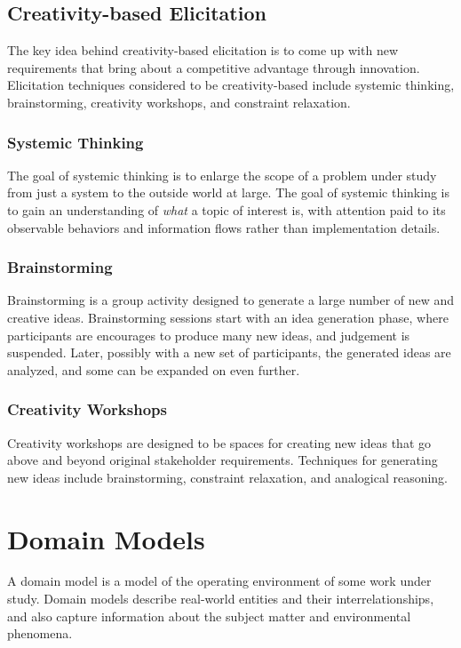 \documentclass[12pt,titlepage]{article}
\begin{document}
    \subsection{Creativity-based Elicitation}
      The key idea behind creativity-based elicitation is to come up with new requirements that bring about a competitive advantage through innovation. Elicitation techniques
      considered to be creativity-based include systemic thinking, brainstorming, creativity workshops, and constraint relaxation.

      \subsubsection{Systemic Thinking}
        The goal of systemic thinking is to enlarge the scope of a problem under study from just a system to the outside world at large. The goal of systemic thinking is to
        gain an understanding of \textit{what} a topic of interest is, with attention paid to its observable behaviors and information flows rather than implementation
        details.

      \subsubsection{Brainstorming}
        Brainstorming is a group activity designed to generate a large number of new and creative ideas. Brainstorming sessions start with an idea generation phase, where
        participants are encourages to produce many new ideas, and judgement is suspended. Later, possibly with a new set of participants, the generated ideas are analyzed,
        and some can be expanded on even further.

      \subsubsection{Creativity Workshops}
        Creativity workshops are designed to be spaces for creating new ideas that go above and beyond original stakeholder requirements. Techniques for generating new ideas
        include brainstorming, constraint relaxation, and analogical reasoning.

  \section{Domain Models}
    A domain model is a model of the operating environment of some work under study. Domain models describe real-world entities and their interrelationships, and also capture
    information about the subject matter and environmental phenomena.
\end{document}
